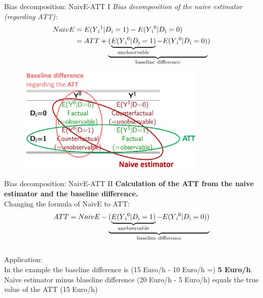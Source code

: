 \documentclass{beamer}\usepackage[]{graphicx}\usepackage[]{xcolor}
\begin{document}
\begin{frame}{Bias decomposition: NaivE-ATT I}
\textit{Bias decomposition of the naive estimator (regarding ATT):}
\begin{align*}
NaivE &= E(Y\textsubscript{i}\textsuperscript{1}\vert D\textsubscript{i}=1)-E(Y\textsubscript{i}\textsuperscript{0} \vert D\textsubscript{i}=0) \\
&= ATT + \underbrace{(\underbrace{E(Y\textsubscript{i}\textsuperscript{0} \vert D\textsubscript{i}=1)}_\text{unobservable} - E(Y\textsubscript{i}\textsuperscript{0} \vert D\textsubscript{i}=0)}_\text{baseline difference})
\end{align*}
\begin{figure}
\centering
\includegraphics[width=0.8\textwidth]{Graphics/Naive_ATT_Baseline.png}
\end{figure}
\end{frame}

\begin{frame}{Bias decomposition: NaivE-ATT II}
\textbf{Calculation of the ATT from the naive estimator and the baseline difference.}
\\[1em]
Changing the formula of NaivE to ATT: \\
\begin{align*}
ATT = NaivE - \underbrace{(\underbrace{E(Y\textsubscript{i}\textsuperscript{0} \vert D\textsubscript{i}=1)}_\text{unobservable}- E(Y\textsubscript{i}\textsuperscript{0} \vert D\textsubscript{i}=0))}_\text{baseline difference}
\end{align*}
\\[1em]
Application:\\
In the example the baseline difference is (15 Euro/h - 10 Euro/h =) \textbf{5 Euro/h}. Naive estimator minus blaseline difference (20 Euro/h - 5 Euro/h) equals the true value of the ATT (15 Euro/h)
\end{frame}
\end{document}
